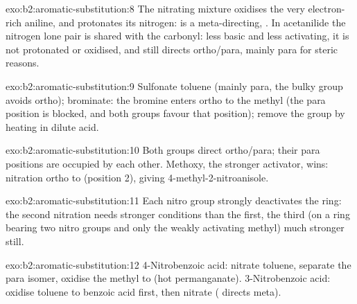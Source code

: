 \begin{solution}{exo:b2:aromatic-substitution:8}
The nitrating mixture oxidises the very electron-rich aniline, and protonates its nitrogen:
 is a meta-directing, . In acetanilide the nitrogen lone pair is
shared with the carbonyl: less basic and less activating, it is not protonated or oxidised,
and still directs ortho/para, mainly para for steric reasons.
\end{solution}

\begin{solution}{exo:b2:aromatic-substitution:9}
Sulfonate toluene (mainly para, the bulky group avoids ortho); brominate: the bromine enters
ortho to the methyl (the para position is blocked, and both groups favour that position);
remove the  group by heating in dilute acid.
\end{solution}

\begin{solution}{exo:b2:aromatic-substitution:10}
Both groups direct ortho/para; their para positions are occupied by each other. Methoxy, the
stronger activator, wins: nitration ortho to  (position 2), giving
4-methyl-2-nitroanisole.
\end{solution}

\begin{solution}{exo:b2:aromatic-substitution:11}
Each nitro group strongly deactivates the ring: the second nitration needs stronger conditions
than the first, the third (on a ring bearing two nitro groups and only the weakly activating
methyl) much stronger still.
\end{solution}

\begin{solution}{exo:b2:aromatic-substitution:12}
4-Nitrobenzoic acid: nitrate toluene, separate the para isomer, oxidise the methyl to
 (hot permanganate). 3-Nitrobenzoic acid: oxidise toluene to benzoic acid first, then
nitrate ( directs meta).
\end{solution}

